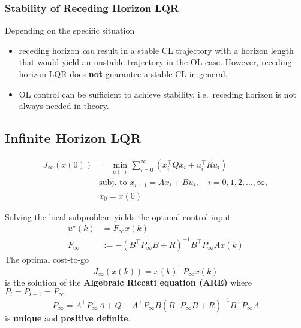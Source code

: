 \subsubsection{Stability of Receding Horizon LQR}

Depending on the specific situation
\begin{itemize}
    \item receding horizon \textit{can} result in a stable CL trajectory with a horizon length that would yield an unstable trajectory in the OL case. However, receding horizon LQR does \textbf{not} guarantee a stable CL in general.
    \item OL control can be sufficient to achieve stability, i.e.\ receding horizon is not always needed in theory.
\end{itemize}

\subsection{Infinite Horizon LQR}


\begin{align*}
    J_\infty(x(0)) & =\min_{u(\cdot)}\sum_{i=0}^\infty\left(x_i^\top Qx_i+u_i^\top Ru_i\right) \\
                   & \text{subj.\ to }x_{i+1}=Ax_i+Bu_i,\quad i=0,1,2,\dots,\infty,            \\
                   & x_0=x(0)
\end{align*}

\newpar{}

Solving the local subproblem yields the optimal control input
\begin{align*}
    u^\star(k) & = F_\infty x(k)                                       \\
    F_\infty   & := -{(B^\top P_\infty B+R)}^{-1}B^\top P_\infty Ax(k)
\end{align*}
The optimal cost-to-go
\begin{equation*}
    J_\infty(x(k))={x(k)}^\top P_\infty x(k)
\end{equation*}
is the solution of the \textbf{Algebraic Riccati equation (ARE)} where $P_i = P_{i+1} = P_{\infty}$
\begin{equation*}
    P_\infty=A^\top P_\infty A+Q-A^\top P_\infty B{(B^\top P_\infty B+R)}^{-1}B^\top P_\infty A
\end{equation*}
is \textbf{unique} and \textbf{positive definite}.

